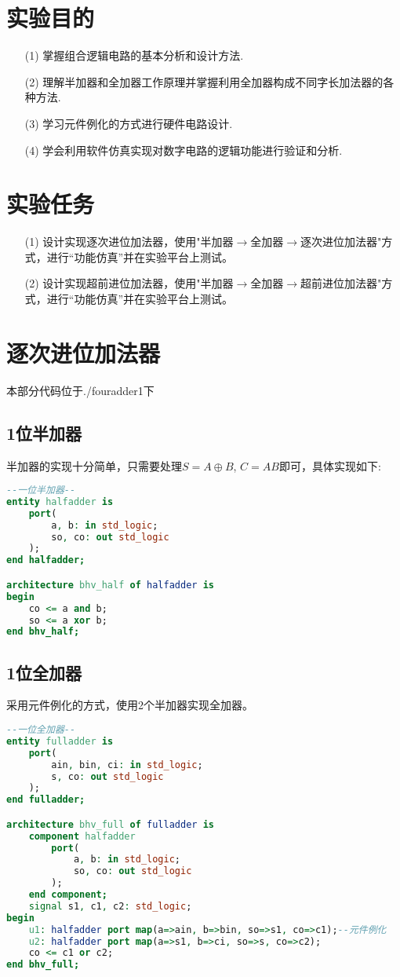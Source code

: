 \documentclass[UTF8, onecolumn, a4paper]{article}
\begin{document}
\section{实验目的}
\begin{enumerate}
	\item[(1)] 掌握组合逻辑电路的基本分析和设计方法.
	\item[(2)] 理解半加器和全加器工作原理并掌握利用全加器构成不同字长加法器的各种方法.
	\item[(3)] 学习元件例化的方式进行硬件电路设计.
	\item[(4)] 学会利用软件仿真实现对数字电路的逻辑功能进行验证和分析.
\end{enumerate}
\section{实验任务}
\begin{enumerate}
	\item[(1)] 设计实现逐次进位加法器，使用"半加器$\rightarrow$全加器$\rightarrow$逐次进位加法器"方式，进行“功能仿真”并在实验平台上测试。
	\item[(2)] 设计实现超前进位加法器，使用"半加器$\rightarrow$全加器$\rightarrow$超前进位加法器"方式，进行“功能仿真”并在实验平台上测试。
\end{enumerate}
	

\section{逐次进位加法器}
本部分代码位于./fouradder1下
\subsection{1位半加器}
半加器的实现十分简单，只需要处理$S = A \oplus B$, $C = AB$即可，具体实现如下:
\begin{lstlisting}[language={VHDL}, title={halfadder.vhd}]
--一位半加器--
entity halfadder is
	port(
		a, b: in std_logic;
		so, co: out std_logic
	);
end halfadder;

architecture bhv_half of halfadder is
begin
	co <= a and b;
	so <= a xor b;
end bhv_half;
\end{lstlisting}
\subsection{1位全加器}
采用元件例化的方式，使用2个半加器实现全加器。
\begin{lstlisting}[language={VHDL}, title={fulladder.vhd}]
--一位全加器--
entity fulladder is
	port(
		ain, bin, ci: in std_logic;
		s, co: out std_logic
	);
end fulladder;

architecture bhv_full of fulladder is
	component halfadder
		port(
			a, b: in std_logic;
			so, co: out std_logic
		);
	end component;
	signal s1, c1, c2: std_logic;
begin
	u1: halfadder port map(a=>ain, b=>bin, so=>s1, co=>c1);--元件例化
	u2: halfadder port map(a=>s1, b=>ci, so=>s, co=>c2);
	co <= c1 or c2;
end bhv_full;
\end{lstlisting}
\end{document}
